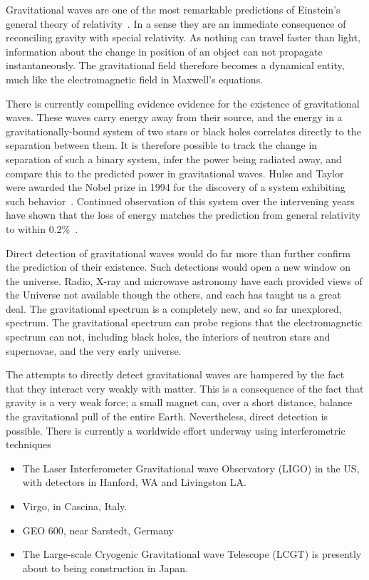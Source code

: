 Gravitational waves are one of the most remarkable predictions of
Einstein's general theory of relativity~\cite{Einstein:1916}.  In a
sense they are an immediate consequence of reconciling gravity with
special relativity.  As nothing can travel faster than light,
information about the change in position of an object can not
propagate instantaneously.  The gravitational field therefore becomes
a dynamical entity, much like the electromagnetic field in Maxwell's
equations.

There is currently compelling evidence evidence for the existence of
gravitational waves.  These waves carry energy away from their source,
and the energy in a gravitationally-bound system of two stars or black
holes correlates directly to the separation between them.  It is
therefore possible to track the change in separation of such a binary
system, infer the power being radiated away, and compare this to the
predicted power in gravitational waves.  Hulse and Taylor were awarded
the Nobel prize in 1994 for the discovery of a system exhibiting such
behavior~\cite{Hulse:1994, Taylor:1994}. Continued observation of this
system over the intervening years have shown that the loss of energy
matches the prediction from general relativity to within
0.2\%~\cite{Weisberg:2004hi}.


Direct detection of gravitational waves would do far more than further
confirm the prediction of their existence.  Such detections would open
a new window on the universe.  Radio, X-ray and microwave astronomy
have each provided views of the Universe not available though the
others, and each has taught us a great deal.  The gravitational
spectrum is a completely new, and so far unexplored, spectrum.  The
gravitational spectrum can probe regions that the electromagnetic
spectrum can not, including black holes, the interiors of neutron
stars and supernovae, and the very early universe.

The attempts to directly detect gravitational waves are hampered by
the fact that they interact very weakly with matter.  This is a
consequence of the fact that gravity is a very weak force; a small
magnet can, over a short distance, balance the gravitational pull of
the entire Earth.  Nevertheless, direct detection is possible.  There
is currently a worldwide effort underway using interferometric
techniques

\begin{itemize}

\item The Laser Interferometer Gravitational wave Observatory (LIGO)
in the US, with detectors in Hanford, WA and Livingston LA.

\item Virgo, in Cascina, Italy.

\item GEO 600, near Sarstedt, Germany

\item The Large-scale Cryogenic Gravitational wave Telescope (LCGT) is
presently about to being construction in Japan.
\end{itemize}

